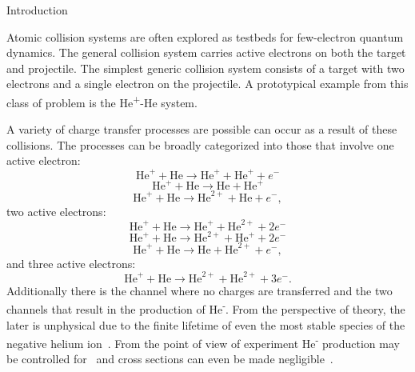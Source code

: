 \documentclass[aps, pra, reprint, groupedaddress, amsfonts,
               amsmath, amssymb, showpacs, nofootinbib]{revtex4-1}
\begin{document}
\begin{section}{Introduction \label{sec:intro}}

   Atomic collision systems are often explored as testbeds for few-electron quantum dynamics. The
   general collision system carries active electrons on both the target and projectile. The simplest
   generic collision system consists of a target with two electrons and a single electron on the
   projectile. A prototypical example from this class of problem is the He\textsuperscript{+}-He system.

   A variety of charge transfer processes are possible can occur as a result of these collisions. The
   processes can be broadly categorized into those that involve one active electron:
   \begin{equation} \label{eq:tpi111}
      \mathrm{He}^+ + \mathrm{He} \rightarrow \mathrm{He}^+ + \mathrm{He}^+ + e^-
   \end{equation}
   \begin{equation} \label{eq:tpi120}
      \mathrm{He}^+ + \mathrm{He} \rightarrow \mathrm{He} + \mathrm{He}^+
   \end{equation}
   \begin{equation} \label{eq:tpi201}
      \mathrm{He}^+ + \mathrm{He} \rightarrow \mathrm{He}^{2+} + \mathrm{He} + e^-,
   \end{equation}
   two active electrons:
   \begin{equation} \label{eq:tpi012}
      \mathrm{He}^+ + \mathrm{He} \rightarrow \mathrm{He}^+ + \mathrm{He}^{2+} + 2e^-
   \end{equation}
   \begin{equation} \label{eq:tpi102}
      \mathrm{He}^+ + \mathrm{He} \rightarrow \mathrm{He}^{2+} + \mathrm{He}^+ + 2e^-
   \end{equation}
   \begin{equation} \label{eq:tpi021}
      \mathrm{He}^+ + \mathrm{He} \rightarrow \mathrm{He} + \mathrm{He}^{2+} + e^-,
   \end{equation}
   and three active electrons:
   \begin{equation} \label{eq:tpi003}
      \mathrm{He}^+ + \mathrm{He} \rightarrow \mathrm{He}^{2+} + \mathrm{He}^{2+} + 3e^{-}.
   \end{equation}
   Additionally there is the channel where no charges are transferred and the two channels that result
   in the production of He\textsuperscript{-}. From the perspective of theory, the later is unphysical
   due to the finite lifetime of even the most stable species of the negative helium
   ion~\cite{neghelife}. From the point of view of experiment He\textsuperscript{-} production
   may be controlled for~\cite{metahe} and cross sections can even be made negligible~\cite{neghe-neg}.


\end{section}
\end{document}
